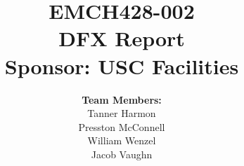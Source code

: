 \documentclass[12pt]{article}
\begin{document}
\onehalfspacing

\title{
    \vspace{2in}
    \textbf{EMCH428-002} \\[1ex]
    \textbf{DFX Report} \\[1ex]
    \textbf{Sponsor: USC Facilities} \\[1ex]
    \vspace{2in}
}

\author{
    \textbf{Team Members:} \\[2ex]
    Tanner Harmon\\[1ex]
    Presston McConnell\\[1ex]
    William Wenzel\\[1ex]
    Jacob Vaughn\\[2ex]
}

\date{}

\maketitle
\thispagestyle{fancy}

\newpage

\setcounter{page}{2} %

\end{document}
